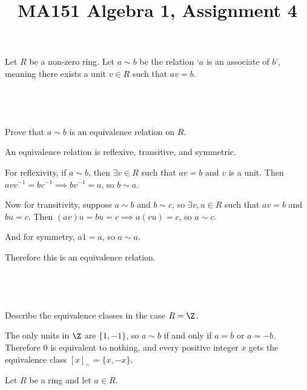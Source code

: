 \documentclass[a4paper]{article}
\title{MA151 Algebra 1, Assignment 4}
\begin{document}
\maketitle

\setlength{\parindent}{0em}
\setlength{\parskip}{1em}


\begin{questionbody}
Let $R$ be a non-zero ring. Let $a \sim b$ be the relation \enquote*{$a$ is an associate of $b$}, meaning there exists a unit $v \in R$ such that $av = b$.
\end{questionbody}

\subsection{~} %

\begin{questionbody}
Prove that $a \sim b$ is an equivalence relation on $R$.
\end{questionbody}

An equivalence relation is reflexive, transitive, and symmetric.

For reflexivity, if $a \sim b$, then $\exists v \in R$ such that $av = b$ and $v$ is a unit. Then $a v v^{-1} = b v^{-1} \implies b v^{-1} = a$, so $b \sim a$.

Now for transitivity, suppose $a \sim b$ and $b \sim c$, so $\exists v, u \in R$ such that $av = b$ and $bu = c$. Then $(av) u = bu = c \implies a (vu) = c$, so $a \sim c$.

And for symmetry, $a 1 = a$, so $a \sim a$.

Therefore this is an equivalence relation.

\subsection{~} %

\begin{questionbody}
Describe the equivalence classes in the case $R = \Z$.
\end{questionbody}

The only units in $\Z$ are $\{1, -1\}$, so $a \sim b$ if and only if $a = b$ or $a = -b$. Therefore $0$ is equivalent to nothing, and every positive integer $x$ gets the equivalence class ${[x]}_\sim = \{x, -x\}$.


\begin{questionbody}
Let $R$ be a ring and let $a \in R$.
\end{questionbody}
\end{document}

